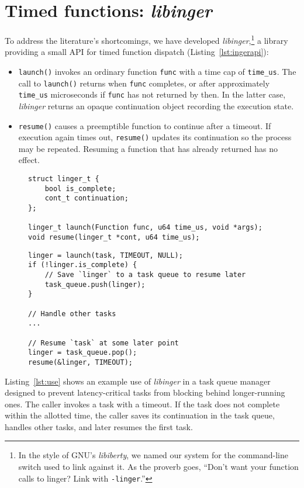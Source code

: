 \section{Timed functions: \textit{libinger}}
\label{sec:libinger}

To address the literature's shortcomings, we have developed
\textit{libinger},\footnote{In the style of GNU's \textit{libiberty}, we named our
system for the command-line switch used to link against it.  As the proverb goes,
``Don't want your function calls to linger?  Link with \texttt{-linger}.''}
a library providing a small API for timed function dispatch
(Listing~\ref{lst:ingerapi}):
\begin{itemize}
\item \texttt{launch()} invokes an ordinary function \texttt{func} with a
time cap of \texttt{time\_us}.  The call to \texttt{launch()} returns when
\texttt{func}
completes, or after approximately \texttt{time\_us} microseconds if \texttt{func} has
not returned
by then.  In the latter case, \textit{libinger} returns an opaque continuation
object recording the execution state.
\item \texttt{resume()} causes a preemptible function to continue after a timeout.
If execution again times out, \texttt{resume()} updates its continuation so the
process may be repeated.  Resuming a function that has already returned has no
effect.
\end{itemize}

\begin{figure}
\begin{lstlisting}[label=lst:ingerapi,caption=Preemptible functions core interface]
struct linger_t {
	bool is_complete;
	cont_t continuation;
};

linger_t launch(Function func, u64 time_us, void *args);
void resume(linger_t *cont, u64 time_us);
\end{lstlisting}
\begin{lstlisting}[label=lst:use, caption=Preemptible function usage example]
linger = launch(task, TIMEOUT, NULL);
if (!linger.is_complete) {
	// Save `linger` to a task queue to resume later
	task_queue.push(linger);
}

// Handle other tasks
...

// Resume `task` at some later point
linger = task_queue.pop();
resume(&linger, TIMEOUT);
\end{lstlisting}
\end{figure}

Listing~\ref{lst:use} shows an example use of \textit{libinger}
in a task queue manager designed to prevent latency-critical tasks from blocking
behind longer-running
ones. The caller invokes a task with a timeout. If the task does not complete
within the allotted time, the caller saves its continuation in the task queue,
handles other tasks, and later resumes the first task.
